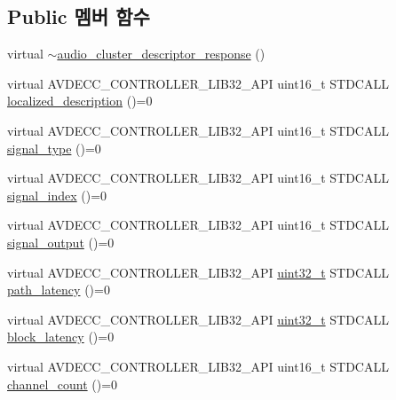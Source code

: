 \subsection*{Public 멤버 함수}
\begin{DoxyCompactItemize}
\item 
virtual \hyperlink{classavdecc__lib_1_1audio__cluster__descriptor__response_a1a0db6c26c135d8c814caff641c23093}{$\sim$audio\+\_\+cluster\+\_\+descriptor\+\_\+response} ()
\item 
virtual A\+V\+D\+E\+C\+C\+\_\+\+C\+O\+N\+T\+R\+O\+L\+L\+E\+R\+\_\+\+L\+I\+B32\+\_\+\+A\+PI uint16\+\_\+t S\+T\+D\+C\+A\+LL \hyperlink{classavdecc__lib_1_1audio__cluster__descriptor__response_a1fb9de45567df344090a1407aa6b775f}{localized\+\_\+description} ()=0
\item 
virtual A\+V\+D\+E\+C\+C\+\_\+\+C\+O\+N\+T\+R\+O\+L\+L\+E\+R\+\_\+\+L\+I\+B32\+\_\+\+A\+PI uint16\+\_\+t S\+T\+D\+C\+A\+LL \hyperlink{classavdecc__lib_1_1audio__cluster__descriptor__response_ac204637e5ecfc30b4cc47c0d78d81ce1}{signal\+\_\+type} ()=0
\item 
virtual A\+V\+D\+E\+C\+C\+\_\+\+C\+O\+N\+T\+R\+O\+L\+L\+E\+R\+\_\+\+L\+I\+B32\+\_\+\+A\+PI uint16\+\_\+t S\+T\+D\+C\+A\+LL \hyperlink{classavdecc__lib_1_1audio__cluster__descriptor__response_aa1d83268f9a492f864d3e213acf71a97}{signal\+\_\+index} ()=0
\item 
virtual A\+V\+D\+E\+C\+C\+\_\+\+C\+O\+N\+T\+R\+O\+L\+L\+E\+R\+\_\+\+L\+I\+B32\+\_\+\+A\+PI uint16\+\_\+t S\+T\+D\+C\+A\+LL \hyperlink{classavdecc__lib_1_1audio__cluster__descriptor__response_a729bc59f434e7de353db02db35977dfa}{signal\+\_\+output} ()=0
\item 
virtual A\+V\+D\+E\+C\+C\+\_\+\+C\+O\+N\+T\+R\+O\+L\+L\+E\+R\+\_\+\+L\+I\+B32\+\_\+\+A\+PI \hyperlink{parse_8c_a6eb1e68cc391dd753bc8ce896dbb8315}{uint32\+\_\+t} S\+T\+D\+C\+A\+LL \hyperlink{classavdecc__lib_1_1audio__cluster__descriptor__response_a48accc5f955ed908845e488ba5dcb5c7}{path\+\_\+latency} ()=0
\item 
virtual A\+V\+D\+E\+C\+C\+\_\+\+C\+O\+N\+T\+R\+O\+L\+L\+E\+R\+\_\+\+L\+I\+B32\+\_\+\+A\+PI \hyperlink{parse_8c_a6eb1e68cc391dd753bc8ce896dbb8315}{uint32\+\_\+t} S\+T\+D\+C\+A\+LL \hyperlink{classavdecc__lib_1_1audio__cluster__descriptor__response_af1eddc3de0237a6db00b74603eba47c6}{block\+\_\+latency} ()=0
\item 
virtual A\+V\+D\+E\+C\+C\+\_\+\+C\+O\+N\+T\+R\+O\+L\+L\+E\+R\+\_\+\+L\+I\+B32\+\_\+\+A\+PI uint16\+\_\+t S\+T\+D\+C\+A\+LL \hyperlink{classavdecc__lib_1_1audio__cluster__descriptor__response_a6912bbd2c6ecaf359466e8251cc1d5ee}{channel\+\_\+count} ()=0

\end{DoxyCompactItemize}
